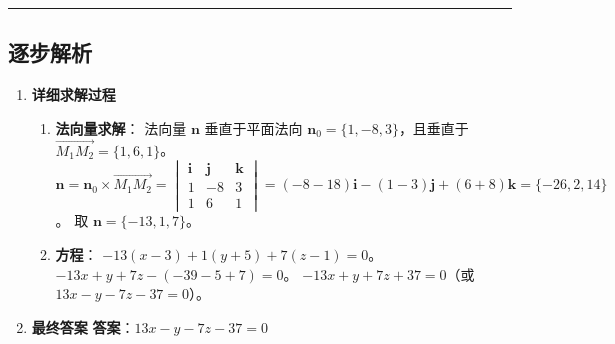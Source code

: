 \documentclass[UTF8]{ctexart}
\newenvironment{redenv}{\color{red}}{}
\newenvironment{detailedanalysis}{%
    \color{red}
    \begin{enumerate}[label=\textbf{第\arabic*步：}, leftmargin=*, align=left, itemsep=1.5ex]
}{%
    \end{enumerate}
}
\newcommand{\analysisrule}{\noindent\rule{\textwidth}{0.8pt}\vspace{-0.8em}}
\begin{document}
\begin{redenv}
\analysisrule
\subsection*{逐步解析}

\begin{detailedanalysis}
\item \textbf{详细求解过程}
\begin{enumerate}[label=(\arabic*)]
\item \textbf{法向量求解}：
法向量 $\mathbf{n}$ 垂直于平面法向 $\mathbf{n}_0 = \{1, -8, 3\}$，且垂直于 $\overrightarrow{M_1 M_2} = \{1, 6, 1\}$。
$\mathbf{n} = \mathbf{n}_0 \times \overrightarrow{M_1 M_2} = \begin{vmatrix} \mathbf{i} & \mathbf{j} & \mathbf{k} \\ 1 & -8 & 3 \\ 1 & 6 & 1 \end{vmatrix} = (-8-18)\mathbf{i} - (1-3)\mathbf{j} + (6+8)\mathbf{k} = \{-26, 2, 14\}$。
取 $\mathbf{n} = \{-13, 1, 7\}$。
\item \textbf{方程}：
$-13(x-3) + 1(y+5) + 7(z-1) = 0$。
$-13x + y + 7z - (-39 - 5 + 7) = 0$。
$-13x + y + 7z + 37 = 0$（或 $13x - y - 7z - 37 = 0$）。
\end{enumerate}

\item \textbf{最终答案}
\textbf{答案}：$ 13x - y - 7z - 37 = 0 $
\end{detailedanalysis}
\end{redenv}
\end{document}
